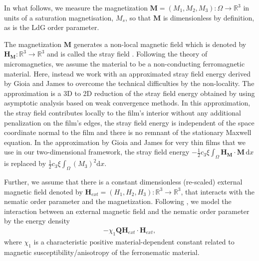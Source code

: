 \documentclass{article}
\def\Qvec{\mathbf{Q}}
\def \Mvec{\mathbf{M}}
\def\Hvec{\mathbf{H}}
\def\d{\mathrm{d}}
\begin{document}
In what follows, we measure the magnetization $\Mvec=\left(M_1, M_2, M_3\right): \Omega\rightarrow\mathbb R^3$ in units of a saturation magnetisation, $M_s$, so that $\Mvec$ is dimensionless by definition, as is the LdG order parameter.

The magnetization $\Mvec$  generates a non-local magnetic field which is denoted by $\Hvec_{\Mvec}: \mathbb R^3\rightarrow\mathbb R^3$ and is called the stray field \cite{brown1966magnetoelastic}. Following the theory of micromagnetics, we assume the material to be a non-conducting ferromagnetic material. 
Here, instead  
 we work with an approximated stray field energy derived by Gioia and James \cite{Giogia} to overcome the technical difficulties by the non-locality. The approximation is a 3D to 2D reduction of the stray field energy obtained by using asymptotic analysis based on weak convergence methods. In this approximation, the stray field contributes locally to the film's interior without any additional penalization on the film's edges, the stray field energy is independent of the space coordinate normal to the film and there is no remnant of the stationary Maxwell equation. In the approximation by Gioia and James \cite{Giogia}  for very thin films that we use in our two-dimensional framework, the stray field energy $-\frac{1}{2}c_3\xi\int_\Omega \Hvec_\Mvec \cdot \Mvec \,  \d x$ is replaced by $\frac{1}{2}c_3\xi\int_\Omega (M_3)^2 \d x$. 

Further, we assume that there is a constant dimensionless (re-scaled) external magnetic field denoted by $\Hvec_{ext} = (H_1, H_2, H_3): \mathbb R^3\rightarrow\mathbb R^3$, that interacts with the nematic order parameter and the magnetization. Following \cite{Calderer, Mertelj}, we model the interaction between an external magnetic field and the nematic order parameter by the energy density
\begin{eqnarray}\label{eq:en6'}
- \chi_1\Qvec\Hvec_{ext}\cdot\Hvec_{ext},
\end{eqnarray}
where $\chi_1$ is a characteristic positive material-dependent constant related to magnetic susceptibility/anisotropy of the ferronematic material. 
\end{document}
